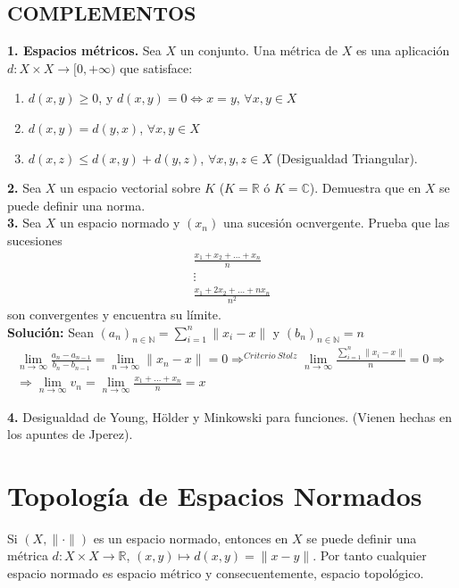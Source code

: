 \documentclass{article}
\begin{document}
\subsection{COMPLEMENTOS}
\textbf{1. Espacios métricos.} Sea $X$ un conjunto. Una métrica de $X$ es una aplicación $d:X\times X\rightarrow [0,+\infty)$ que satisface:
\begin{enumerate}
\item $d(x,y)\geq 0$, y $d(x,y)=0\Leftrightarrow x=y$, $\forall x,y\in X$

\item $d(x,y)=d(y,x)$, $\forall x,y\in X$

\item $d(x,z)\leq d(x,y)+d(y,z)$, $\forall x,y,z\in X$ (Desigualdad Triangular).
\end{enumerate}

\textbf{2.} Sea $X$ un espacio vectorial sobre $K$ ($K=\mathbb{R}$ ó $K=\mathbb{C}$). Demuestra que en $X$ se puede definir una norma.\\

\textbf{3.} Sea $X$ un espacio normado y $(x_n)$ una sucesión ocnvergente. Prueba que las sucesiones
\begin{gather*}
\frac{x_1+x_2+\ldots+x_n}{n}\\
\vdots \\
\frac{x_1+2x_2+\ldots+nx_n}{n^2}
\end{gather*}
son convergentes y encuentra su límite.\\

\textbf{Solución:} Sean $(a_n)_{n\in \mathbb{N}}=\sum_{i=1}^n\|x_i-x\|$ y $(b_n)_{n\in\mathbb{N}}=n$
\begin{gather*}
\lim_{n\to \infty}\frac{a_n-a_{n-1}}{b_n-b_{n-1}}=\lim_{n\to\infty}\|x_n-x\|=0\Rightarrow^{Criterio\:Stolz}\lim_{n\to \infty}\frac{\sum_{i=1}^n\|x_i-x\|}{n}=0\Rightarrow\\
\Rightarrow \lim_{n\to\infty}v_n=\lim_{n\to\infty}\frac{x_1+\ldots+x_n}{n}=x
\end{gather*}

\textbf{4.} Desigualdad de Young, Hölder y Minkowski para funciones. (Vienen hechas en los apuntes de Jperez).

\section{Topología de Espacios Normados}
Si $(X,\|\cdot\|)$ es un espacio normado, entonces en $X$ se puede definir una métrica $d:X\times X\rightarrow \mathbb{R}$, $(x,y)\mapsto d(x,y)=\|x-y\|$. Por tanto cualquier espacio normado es espacio métrico y consecuentemente, espacio topológico.
\end{document}
